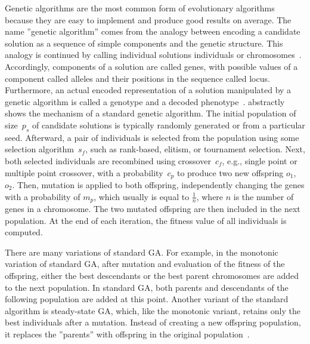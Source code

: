 \documentclass[paper=a4,%
  twoside,%
  BCOR4mm,%
  abstract=true,%
  toc=bibliography,%
  chapterprefix=true,%
  toc=bibliographynumbered,%
  open=right,%
  english,%
  pagesize=pdftex]{scrreprt}
\begin{document}
Genetic algorithms are the most common form of evolutionary algorithms because they are easy to implement and produce good results on average. The name ''genetic algorithm'' comes from the analogy between encoding a candidate solution as a sequence of simple components and the genetic structure. This analogy is continued by calling individual solutions individuals or chromosomes~\cite{Campos2017}. Accordingly, components of a solution are called genes, with possible values of a component called alleles and their positions in the sequence called locus. Furthermore, an actual encoded representation of a solution manipulated by a genetic algorithm is called a genotype and a decoded phenotype~\cite{McMinn_2004}.  abstractly shows the mechanism of a standard genetic algorithm. The initial population of size~$p_s$ of candidate solutions is typically randomly generated or from a particular seed. Afterward, a pair of individuals is selected from the population using some selection algorithm~$s_f$, such as rank-based, elitism, or tournament selection. Next, both selected individuals are recombined using crossover~$c_f$, e.g., single point or multiple point crossover, with a probability~$c_p$ to produce two new offspring $o_1$, $o_2$. Then, mutation is applied to both offspring, independently changing the genes with a probability of $m_p$, which usually is equal to $\frac{1}{n}$, where $n$ is the number of genes in a chromosome. The two mutated offspring are then included in the next population. At the end of each iteration, the fitness value of all individuals is computed.  

There are many variations of standard \ac{GA}. For example, in the monotonic variation of standard \ac{GA}, after mutation and evaluation of the fitness of the offspring, either the best descendants or the best parent chromosomes are added to the next population. In standard \ac{GA}, both parents and descendants of the following population are added at this point. Another variant of the standard algorithm is steady-state \ac{GA}, which, like the monotonic variant, retains only the best individuals after a mutation. Instead of creating a new offspring population, it replaces the ''parents'' with offspring in the original population~\cite{Campos2017}.
\end{document}
